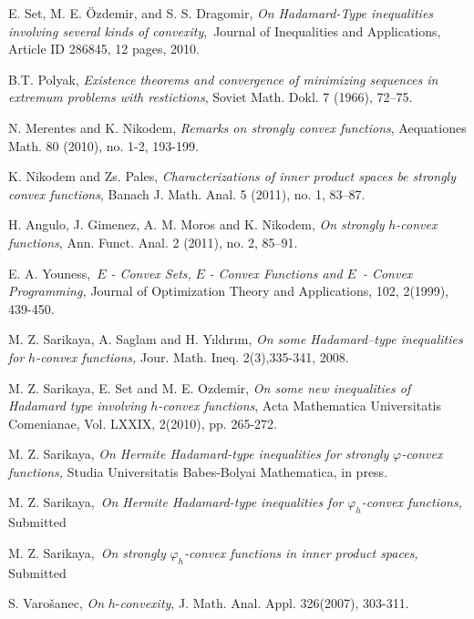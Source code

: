 \documentclass{amsart}
\theoremstyle{plain}
\numberwithin{equation}{section}
\begin{document}
\begin{thebibliography}{99}
 E. Set, M. E. \"{O}zdemir, and S. S. Dragomir, \textit{On
Hadamard-Type inequalities involving several kinds of convexity},\ Journal
of Inequalities and Applications, Article ID 286845, 12 pages, 2010.

 B.T. Polyak, \textit{Existence theorems and convergence of
minimizing sequences in extremum problems with restictions}, Soviet Math.
Dokl. 7 (1966), 72--75.

 N. Merentes and K. Nikodem, \textit{Remarks on strongly convex
functions}, Aequationes Math. 80 (2010), no. 1-2, 193-199.

 K. Nikodem and Zs. Pales, \textit{Characterizations of inner
product spaces be strongly convex functions}, Banach J. Math. Anal. 5
(2011), no. 1, 83--87.

 H. Angulo, J. Gimenez, A. M. Moros and K. Nikodem, \textit{On
strongly }$h$\textit{-convex functions}, Ann. Funct. Anal. 2 (2011), no. 2,
85--91.

 E. A. Youness,\textit{\ }$E$ \textit{- Convex Sets, }$E$ 
\textit{- Convex Functions and }$E$\textit{\ - Convex Programming,} Journal
of Optimization Theory and Applications, 102, 2(1999), 439-450.

 M. Z. Sarikaya, A. Saglam and H. Y\i ld\i r\i m, \textit{On some Hadamard--type inequalities for }$h$\textit{-convex functions,}
Jour. Math. Ineq. 2(3),335-341, 2008.

 M. Z. Sarikaya, E. Set and M. E. Ozdemir, \textit{On
some new inequalities of Hadamard type involving }$h$\textit{-convex
functions}, Acta Mathematica Universitatis Comenianae, Vol. LXXIX, 2(2010),
pp. 265-272.

 M. Z. Sarikaya, \textit{On Hermite Hadamard-type
inequalities for strongly }$\varphi $\textit{-convex functions,} Studia
Universitatis Babes-Bolyai Mathematica, in press.

 M. Z. Sarikaya,\textit{\ On Hermite Hadamard-type
inequalities for }$\varphi _{h}$\textit{-convex functions,} Submitted

 M. Z. Sarikaya,\textit{\ On strongly }$\varphi _{h}$\textit{-convex functions in inner product spaces,} Submitted

 S. Varo\v{s}anec, \textit{On }$h$-\textit{convexity}, J.
Math. Anal. Appl. 326(2007), 303-311.
\end{thebibliography}
\end{document}

